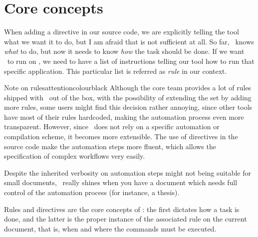 \section{Core concepts}
\label{sec:coreconcepts}

When adding a directive in our source code, we are explicitly telling the tool what we want it to do, but I am afraid that is not sufficient at all. So far, \arara\ knows \emph{what} to do, but now it needs to know \emph{how} the task should be done. If we want \arara\ to run  on , we need to have a list of instructions telling our tool how to run that specific application. This particular list is referred as \emph{rule} in our context. 

\begin{messagebox}{Note on rules}{attentioncolour}{\icattention}{black}
Although the core team provides a lot of rules shipped with \arara\ out of the box, with the possibility of extending the set by adding more rules, some users might find this decision rather annoying, since other tools have most of their rules hardcoded, making the automation process even more transparent. However, since \arara\ does not rely on a specific automation or compilation scheme, it becomes more extensible. The use of directives in the source code make the automation steps more fluent, which allows the specification of complex workflows very easily.
\end{messagebox}

Despite the inherited verbosity on automation steps might not being suitable for small documents, \arara\ really shines when you have a document which needs full control of the automation process (for instance, a thesis).

Rules and directives are the core concepts of \arara: the first dictates how a task is done, and the latter is the proper instance of the associated rule on the current document, that is, when and where the commands must be executed.

